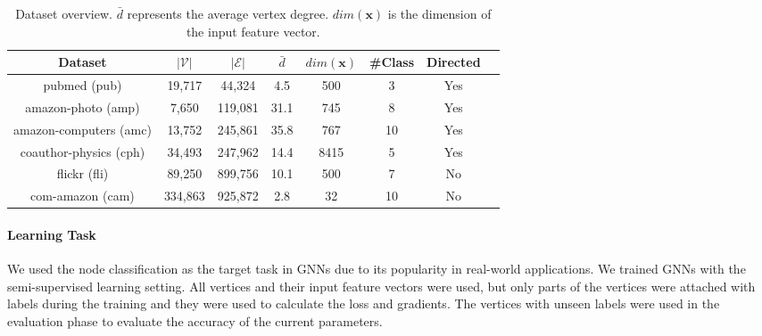\begin{table}
    \centering
    \small
    \begin{tabular}{cccccccc}
        \toprule
        Dataset                                                 & $|\mathcal{V}|$ & $|\mathcal{E}|$ & $\bar{d}$ & $dim(\boldsymbol{x})$ & \#Class & Directed \\
        \midrule
        pubmed (pub) \cite{yang2016_revisiting_semisupervised}  & 19,717          & 44,324          & 4.5       & 500                   & 3       & Yes      \\
        amazon-photo (amp) \cite{shchur2018_pitfall_of_gnn}     & 7,650           & 119,081         & 31.1      & 745                   & 8       & Yes      \\
        amazon-computers (amc) \cite{shchur2018_pitfall_of_gnn} & 13,752          & 245,861         & 35.8      & 767                   & 10      & Yes      \\
        coauthor-physics (cph) \cite{shchur2018_pitfall_of_gnn} & 34,493          & 247,962         & 14.4      & 8415                  & 5       & Yes      \\
        flickr (fli) \cite{zeng2020_graphsaint}                 & 89,250          & 899,756         & 10.1      & 500                   & 7       & No       \\
        com-amazon (cam) \cite{yang2012_defining}               & 334,863         & 925,872         & 2.8       & 32                    & 10      & No       \\
        \bottomrule
    \end{tabular}
    \caption{Dataset overview. $\bar{d}$ represents the average vertex degree. $dim(\boldsymbol{x})$ is the dimension of the input feature vector.}
    \label{tab:dataset_overview}
\end{table}

\paragraph{Learning Task}
We used the node classification as the target task in GNNs due to its popularity in real-world applications.
We trained GNNs with the semi-supervised learning setting.
All vertices and their input feature vectors were used, but only parts of the vertices were attached with labels during the training and they were used to calculate the loss and gradients.
The vertices with unseen labels were used in the evaluation phase to evaluate the accuracy of the current parameters.

